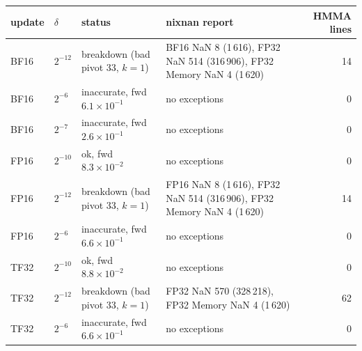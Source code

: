 \begin{tabular}{llp{3.6cm}p{5.6cm}r}
\toprule
update & $\delta$ & status & nixnan report & HMMA lines\\
\midrule
BF16 & $2^{-12}$ & breakdown (bad pivot 33, $k=1$) & BF16 NaN 8 (1\,616), FP32 NaN 514 (316\,906), FP32 Memory NaN 4 (1\,620) & 14\\
BF16 & $2^{-6}$ & inaccurate, fwd $6.1\!\times\!10^{-1}$ & no exceptions & 0\\
BF16 & $2^{-7}$ & inaccurate, fwd $2.6\!\times\!10^{-1}$ & no exceptions & 0\\
FP16 & $2^{-10}$ & ok, fwd $8.3\!\times\!10^{-2}$ & no exceptions & 0\\
FP16 & $2^{-12}$ & breakdown (bad pivot 33, $k=1$) & FP16 NaN 8 (1\,616), FP32 NaN 514 (316\,906), FP32 Memory NaN 4 (1\,620) & 14\\
FP16 & $2^{-6}$ & inaccurate, fwd $6.6\!\times\!10^{-1}$ & no exceptions & 0\\
TF32 & $2^{-10}$ & ok, fwd $8.8\!\times\!10^{-2}$ & no exceptions & 0\\
TF32 & $2^{-12}$ & breakdown (bad pivot 33, $k=1$) & FP32 NaN 570 (328\,218), FP32 Memory NaN 4 (1\,620) & 62\\
TF32 & $2^{-6}$ & inaccurate, fwd $6.6\!\times\!10^{-1}$ & no exceptions & 0\\
\bottomrule
\end{tabular}
